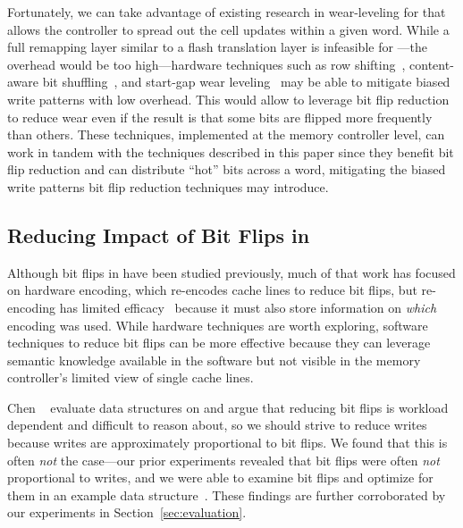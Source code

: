 Fortunately, we can take advantage of existing research in wear-leveling for \NVM that allows
the controller to spread out the cell updates within a given word.
While a full remapping layer similar to a flash translation layer is infeasible
for \NVM---the overhead would be too high---hardware techniques such as row
shifting~\cite{zhou:isca09:fixed}, content-aware bit shuffling~\cite{Han:cabs}, and
start-gap wear leveling~\cite{qureshi:micro09} may be able to mitigate biased
write patterns with low overhead. This would allow \NVM to leverage bit flip
reduction to reduce wear even if the result is that some bits are flipped more
frequently than others.  These techniques, implemented at the memory
controller level, can work in tandem with the techniques described in this paper since they benefit
bit flip reduction and can distribute ``hot'' bits across a word, mitigating the biased write
patterns bit flip reduction techniques may introduce.


\subsection{Reducing Impact of Bit Flips in \NVM}

Although bit flips in \NVM have been studied previously, much of that work has
focused on hardware encoding, which re-encodes cache lines to reduce bit flips,
but re-encoding has limited efficacy~\cite{flipnwrite,
	jacobvitz2013coset, seyedzadeh2016coset} because it must also store information
on \textit{which} encoding was used. While hardware techniques are worth
exploring, software techniques to reduce bit flips can be more effective because
they can leverage semantic knowledge available in the software but not
visible in the memory controller's limited view of single cache lines.

Chen \etal~\cite{Chen_rethinkingdatabase} evaluate data structures on \NVM and
argue that reducing bit flips is workload dependent and difficult to reason
about, so we should strive to reduce writes because writes are approximately
proportional to bit flips. We found that this is often \emph{not} the case---our prior experiments
revealed that bit flips were often \emph{not} proportional to writes, and we were able to
examine bit flips and optimize for them in an example data structure~\cite{bittman:nvmsa18}. These findings are further
corroborated by our experiments in Section~\ref{sec:evaluation}.

